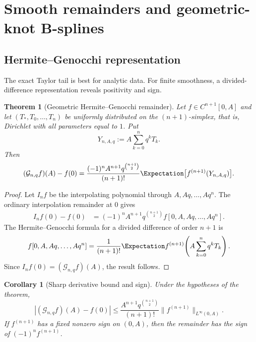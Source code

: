 \documentclass[11pt,oneside]{article}
\numberwithin{equation}{section}
\newtheorem{theorem}{Theorem}[section]
\newtheorem{corollary}[corollary]{Corollary}
\theoremstyle{definition}
\theoremstyle{remark}
\newcommand{\Gc}{\mathcal G}
\begin{document}
\section{Smooth remainders and geometric-knot B-splines}
\label{sec:bspline}

\subsection{Hermite--Genocchi representation}

The exact Taylor tail is best for analytic data.  For finite smoothness, a
divided-difference representation reveals positivity and sign.

\begin{theorem}[Geometric Hermite--Genocchi remainder]
Let $f\in C^{n+1}[0,A]$ and let
$(T_*,T_0,\ldots,T_n)$ be uniformly distributed on the $(n+1)$-simplex,
that is, Dirichlet with all parameters equal to $1$.  Put
\begin{equation}
 Y_{n,A,q}:=A\sum_{k=0}^nq^kT_k.
 \label{eq:Y-dirichlet}
\end{equation}
Then
\begin{equation}
 (\Gc_{n,q}f)(A)-f(0)
 =\frac{(-1)^nA^{n+1}q^{\binom{n+1}{2}}}{(n+1)!}
 \Expectation\bigl[f^{(n+1)}(Y_{n,A,q})\bigr].
 \label{eq:HG-remainder}
\end{equation}
\end{theorem}

\begin{proof}
Let $I_nf$ be the interpolating polynomial through $A,Aq,\ldots,Aq^n$.
The ordinary interpolation remainder at $0$ gives
\begin{align*}
 I_nf(0)-f(0)
 &=(-1)^nA^{n+1}q^{\binom{n+1}{2}}
 f[0,A,Aq,\ldots,Aq^n].
\end{align*}
The Hermite--Genocchi formula for a divided difference of order $n+1$ is
\[
 f[0,A,Aq,\ldots,Aq^n]
 =\frac1{(n+1)!}
 \Expectation f^{(n+1)}\!\left(A\sum_{k=0}^nq^kT_k\right).
\]
Since $I_nf(0)=(\Gc_{n,q}f)(A)$, the result follows.
\end{proof}

\begin{corollary}[Sharp derivative bound and sign]
Under the hypotheses of the theorem,
\begin{equation}
 |(\Gc_{n,q}f)(A)-f(0)|
 \le\frac{A^{n+1}q^{\binom{n+1}{2}}}{(n+1)!}
 \|f^{(n+1)}\|_{L^\infty(0,A)}.
 \label{eq:smooth-bound}
\end{equation}
If $f^{(n+1)}$ has a fixed nonzero sign on $(0,A)$, then the remainder has the
sign of $(-1)^nf^{(n+1)}$.
\end{corollary}
\end{document}
